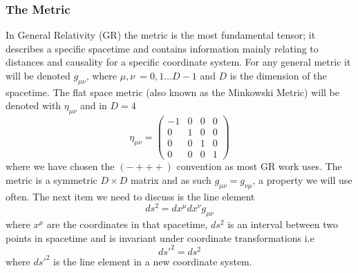 \documentclass[12pt]{article}
\numberwithin{equation}{section}
\numberwithin{figure}{section}
\begin{document}
\subsubsection{The Metric} %
\label{subsub:the_metric}
In General Relativity (GR) the metric is the most fundamental tensor; it describes a specific spacetime and contains information mainly relating to distances and causality for a specific coordinate system. For any general metric it will be denoted $g_{\mu\nu}$, where $\mu,\nu\ =0,1 \ldots D-1$ and $D$ is the dimension of the spacetime. The flat space metric (also known as the Minkowski Metric) will be denoted with $\eta_{\mu\nu}$ and in $D=4$ 
\begin{equation}
	\eta_{\mu\nu} = 
	\begin{pmatrix}
		-1 & 0 & 0 & 0 \\
		0 & 1 & 0 & 0 \\
		0 & 0 & 1 & 0 \\
		0 & 0 & 0 & 1 
	\end{pmatrix}
\end{equation}
where we have chosen the $(- + + + )$ convention as most GR work uses. The metric is a symmetric $D\times D$ matrix and as such $g_{\mu\nu} = g_{\nu\mu}$, a property we will use often. The next item we need to discuss is the line element
\begin{equation}
	ds^2 = dx^\mu dx^\nu g_{\mu\nu}
\end{equation}
where $x^\mu$ are the coordinates in that spacetime, $ds^2$ is an interval between two points in spacetime and is invariant under coordinate transformations i.e
\begin{equation}
	ds'^2=ds^2
\end{equation}
where $ds'^2$ is the line element in a new coordinate system.
\end{document}
